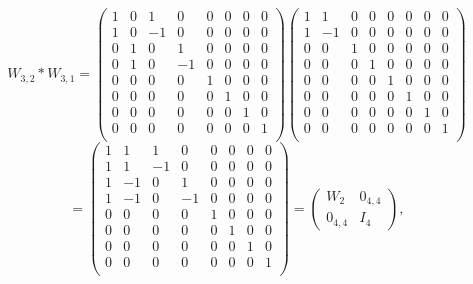 \documentclass[12pt]{article}
\begin{document}
\\
\[
W_{3, 2}*W_{3, 1} = 
\begin{pmatrix}
1  &  0  & 1    &  0   & 0    & 0  &  0  &  0  \\
1  &  0  &  -1 &  0   & 0    & 0  &  0  &  0 \\
0   &  1  &  0  &  1   & 0    & 0  &  0  &  0 \\
0   &  1  &  0  &  -1 & 0    & 0  &  0  &  0 \\
0   &  0  &  0 & 0 &  1  &  0  & 0    & 0  \\
0   &  0  &  0 & 0 &  0  &  1  &  0   & 0  \\
0   &  0  &  0 & 0 &  0  &  0  &  1   & 0  \\
0   &  0  &  0 & 0 &  0  &  0  & 0    & 1  \\
\end{pmatrix}
\begin{pmatrix}
1  &  1   & 0    &  0   & 0    & 0  &  0  &  0  \\
1  & -1  &  0   &  0   & 0    & 0  &  0  &  0 \\
0   &  0  &  1   &   0   & 0    & 0  &  0  &  0 \\
0   &  0   &  0  &   1 & 0    & 0  &  0  &  0 \\
0   &  0  &  0 & 0 &  1  &  0  & 0    & 0  \\
0   &  0  &  0 & 0 &  0  &  1  &  0   & 0  \\
0   &  0  &  0 & 0 &  0  &  0  &  1   & 0  \\
0   &  0  &  0 & 0 &  0  &  0  & 0    & 1  \\
\end{pmatrix}
\]
\[
=
\begin{pmatrix}
1 & 1 & 1 & 0 & 0 & 0 & 0 & 0 \\   
1 & 1 & -1 & 0 & 0 & 0 & 0 & 0 \\
1 & -1 & 0 & 1 & 0 &  0 &  0 &  0 \\
1 & -1 & 0 & -1 & 0 & 0 & 0 &  0 \\
0 & 0 & 0 & 0 & 1 & 0 & 0 & 0 \\
0 & 0 & 0 & 0 & 0 & 1 & 0 & 0 \\
0 & 0 & 0 & 0 & 0 & 0 & 1 & 0 \\
0 & 0 & 0 & 0 & 0 & 0 & 0 & 1 \\
\end{pmatrix}
= 
\begin{pmatrix}
W_2 & 0_{4, 4} \\
0_{4, 4}         & I_4
\end{pmatrix},
\]
\end{document}
